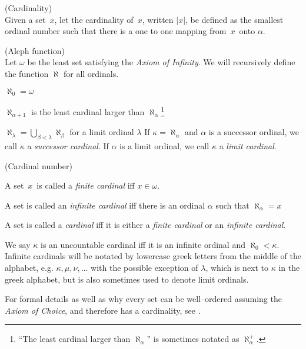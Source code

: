 \begin{definition}{(Cardinality)}\\
Given a set~$x$, let the cardinality of~$x$, written $|x|$, be defined as the smallest ordinal number such that there is a one to one mapping from~$x$~onto $\alpha$.
\end{definition}

\begin{definition}{(Aleph function)}\label{def:aleph}\\
Let $\omega$ be the least set satisfying the \emph{Axiom of Infinity}.
We will recursively define the function $\aleph$ for all ordinals.
\bce[(i)]
\item $\aleph_0 = \omega$
\item $\aleph_{\alpha+1}$ is the least cardinal larger than $\aleph_\alpha$\footnote{``The least cardinal larger than $\aleph_\alpha$'' is sometimes notated as $\aleph_\alpha^{+}$.}
\item $\aleph_\lambda = \bigcup_{\beta < \lambda}\aleph_\beta$ for a limit ordinal $\lambda$
\ece
If $\kappa = \aleph_\alpha$ and $\alpha$ is a successor ordinal, we call $\kappa$ a \emph{successor cardinal}. If $\alpha$ is a limit ordinal, we call $\kappa$ a \emph{limit cardinal}.
\end{definition} %

\begin{definition}{(Cardinal number)}\label{def:cardinal}\\
\bce[(i)]
\item A set~$x$~is called a \emph{finite cardinal} iff $x \in \omega$.
\item A set is called an \emph{infinite cardinal} iff there is an ordinal $\alpha$ such that $\aleph_\alpha = x$
\item A set is called a \emph{cardinal} iff it is either a \emph{finite cardinal} or an \emph{infinite cardinal}.
\ece
\end{definition}
We say $\kappa$ is an uncountable cardinal iff it is an infinite ordinal and $\aleph_0 < \kappa$.
Infinite cardinals will be notated by lowercase greek letters from the middle of the alphabet, e.g. $\kappa, \mu, \nu, \ldots$ with the possible exception of $\lambda$, which is next to $\kappa$ in the greek alphabet, but is also sometimes used to denote limit ordinals.

For formal details as well as why every set can be well–ordered assuming the \emph{Axiom of Choice}, and therefore has a cardinality, see \cite{JechBook}. %

